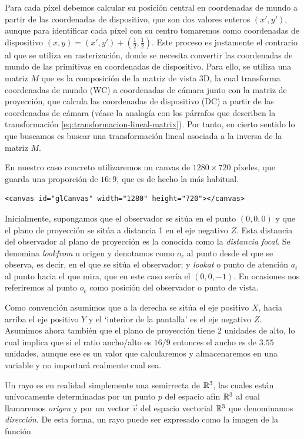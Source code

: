 Para cada píxel debemos calcular su posición central en coordenadas de mundo a partir de las coordenadas de dispositivo, que son dos valores enteros $(x',y')$, aunque para identificar cada píxel con su centro tomaremos como coordenadas de dispositivo $(x,y)=(x',y')+\left(\frac 1 2, \frac 1 2\right)$. Este proceso es justamente el contrario al que se utiliza en rasterización, donde se necesita convertir las coordenadas de mundo de las primitivas en coordenadas de dispositivo. Para ello, se utiliza una matriz $M$ que es la composición de la matriz de vista 3D, la cual transforma coordenadas de mundo (WC) a coordenadas de cámara junto con la matriz de proyección, que calcula las coordenadas de dispositivo (DC) a partir de las coordenadas de cámara (véase la analogía con los párrafos que describen la transformación \ref{eq:transformacion-lineal-matrix}). Por tanto, en cierto sentido lo que buscamos es buscar una transformación lineal asociada a la inversa de la matriz $M$.

En nuestro caso concreto utilizaremos un canvas de $1280\times 720$ píxeles, que guarda una proporción de $16:9$, que es de hecho la más habitual.

\begin{lstlisting}
<canvas id="glCanvas" width="1280" height="720"></canvas>
\end{lstlisting}

Inicialmente, supongamos que el observador se sitúa en el punto $(0,0,0)$ y que el plano de proyección se sitúa a distancia 1 en el eje negativo $Z$. Esta distancia del observador al plano de proyección es la conocida como la \textit{distancia focal}. Se denomina \textit{lookfrom} u origen y denotamos como $o_c$ al punto desde el que se observa, es decir, en el que se sitúa el observador; y \textit{lookat} o punto de atención $a_t$ al punto hacia el que mira, que en este caso sería el $(0,0,-1)$. En ocasiones nos referiremos al punto $o_c$ como posición del observador o punto de vista.

Como convención asumimos que a la derecha se sitúa el eje positivo $X$, hacia arriba el eje positivo $Y$ y el `interior de la pantalla' es el eje negativo $Z$. Asumimos ahora también que el plano de proyección tiene 2 unidades de alto, lo cual implica que si el ratio ancho/alto es $16/9$ entonces el ancho es de $3.55$ unidades, aunque ese es un valor que calcularemos y almacenaremos en una variable y no importará realmente cual sea.

Un rayo es en realidad simplemente una semirrecta de $\mathbb{R}^3$, las cuales están unívocamente determinadas por un punto $p$ del espacio afín $\mathbb{R}^3$ al cual llamaremos \textit{origen} y por un vector $\vec v$ del espacio vectorial $\mathbb{R}^3$ que denominamos \textit{dirección}. De esta forma, un rayo puede ser expresado como la imagen de la función

